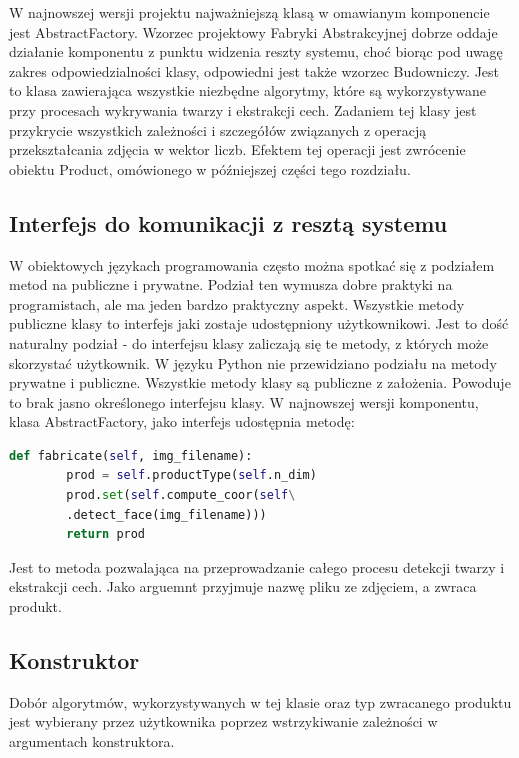 \documentclass[oneside, eng]{mgr}
\begin{document}
W najnowszej wersji projektu najważniejszą klasą w omawianym komponencie jest AbstractFactory. Wzorzec projektowy Fabryki Abstrakcyjnej dobrze oddaje działanie komponentu z punktu widzenia reszty systemu, choć biorąc pod uwagę zakres odpowiedzialności klasy, odpowiedni jest także wzorzec Budowniczy. Jest to klasa zawierająca wszystkie niezbędne algorytmy, które są wykorzystywane przy procesach wykrywania twarzy i ekstrakcji cech. Zadaniem tej klasy jest przykrycie wszystkich zależności i szczegółów związanych z operacją przekształcania zdjęcia w wektor liczb. Efektem tej operacji jest zwrócenie obiektu Product, omówionego w późniejszej części tego rozdziału.

\subsection{Interfejs do komunikacji z resztą systemu}

W obiektowych językach programowania często można spotkać się z podziałem metod na publiczne i prywatne. Podział ten wymusza dobre praktyki na programistach, ale ma jeden bardzo praktyczny aspekt. Wszystkie metody publiczne klasy to interfejs jaki zostaje udostępniony użytkownikowi. Jest to dość naturalny podział - do interfejsu klasy zaliczają się te metody, z których może skorzystać użytkownik. W języku Python nie przewidziano podziału na metody prywatne i publiczne. Wszystkie metody klasy są publiczne z założenia. Powoduje to brak jasno określonego interfejsu klasy. W najnowszej wersji komponentu, klasa AbstractFactory, jako interfejs udostępnia metodę:

\begin{lstlisting}[language=Python]
    def fabricate(self, img_filename):
        prod = self.productType(self.n_dim)
        prod.set(self.compute_coor(self\
        .detect_face(img_filename)))
        return prod
\end{lstlisting}

Jest to metoda pozwalająca na przeprowadzanie całego procesu detekcji twarzy i ekstrakcji cech. Jako arguemnt przyjmuje nazwę pliku ze zdjęciem, a zwraca produkt.

\subsection{Konstruktor}

Dobór algorytmów, wykorzystywanych w tej klasie oraz typ zwracanego produktu jest wybierany przez użytkownika poprzez wstrzykiwanie zależności w argumentach konstruktora.
\end{document}
